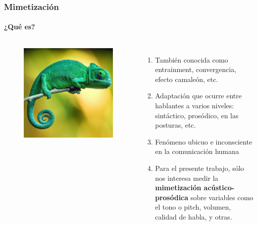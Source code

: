 \begin{frame}
  \frametitle{Mimetización}
  \framesubtitle{¿Qué es?}
  \begin{columns}
    \begin{figure}
      \includegraphics[width=\textwidth]{images/camaleon.jpg}
    \end{figure}

  \begin{enumerate}
    \item También conocida como entrainment, convergencia, efecto camaleón, etc.
    \item Adaptación que ocurre entre hablantes a varios niveles: sintáctico, prosódico, en las posturas, etc.
    \item Fenómeno ubicuo e inconsciente en la comunicación humana
    \item Para el presente trabajo, sólo nos interesa medir la \textbf{mimetización acústico-prosódica} sobre variables como el tono o pitch, volumen, calidad de habla, y otras.

  \end{enumerate}

  \end{columns}

\end{frame}


